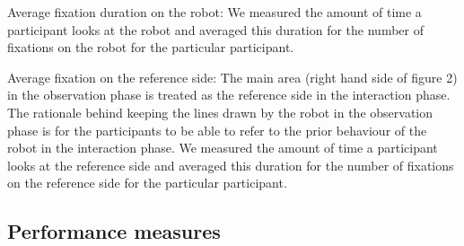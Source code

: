 \documentclass{sig-alternate}
\begin{document}
Average fixation duration on the robot: We measured the amount of time a
participant looks at the robot and averaged this duration for the number
of fixations on the robot for the particular participant.

Average fixation on the reference side: The main area (right hand side
of figure 2) in the observation phase is treated as the reference side
in the interaction phase. The rationale behind keeping the lines drawn
by the robot in the observation phase is for the participants to be able
to refer to the prior behaviour of the robot in the interaction phase. We
measured the amount of time a participant looks at the reference side
and averaged this duration for the number of fixations on the reference
side for the particular participant.

\subsection{Performance measures}



%
\end{document}
